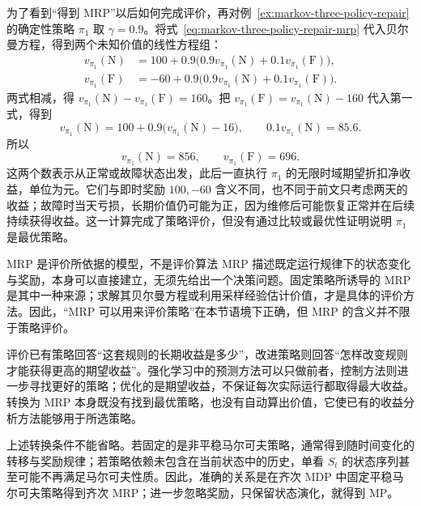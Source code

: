 \documentclass[UTF8]{ctexart}
\begin{document}
为了看到“得到 MRP”以后如何完成评价，再对例~\ref{ex:markov-three-policy-repair} 的确定性策略 $\pi_1$ 取 $\gamma=0.9$。将式~\eqref{eq:markov-three-policy-repair-mrp} 代入贝尔曼方程，得到两个未知价值的线性方程组：
\begin{equation}
  \begin{aligned}
    v_{\pi_1}(\mathrm N)&=100+0.9\bigl(0.9v_{\pi_1}(\mathrm N)+0.1v_{\pi_1}(\mathrm F)\bigr),\\
    v_{\pi_1}(\mathrm F)&=-60+0.9\bigl(0.9v_{\pi_1}(\mathrm N)+0.1v_{\pi_1}(\mathrm F)\bigr).
  \end{aligned}
  \label{eq:markov-three-repair-bellman}
\end{equation}
两式相减，得 $v_{\pi_1}(\mathrm N)-v_{\pi_1}(\mathrm F)=160$。把 $v_{\pi_1}(\mathrm F)=v_{\pi_1}(\mathrm N)-160$ 代入第一式，得到
\[
  v_{\pi_1}(\mathrm N)=100+0.9\bigl(v_{\pi_1}(\mathrm N)-16\bigr),
  \qquad
  0.1v_{\pi_1}(\mathrm N)=85.6.
\]
所以
\begin{equation}
  v_{\pi_1}(\mathrm N)=856,\qquad v_{\pi_1}(\mathrm F)=696.
  \label{eq:markov-three-repair-values}
\end{equation}
这两个数表示从正常或故障状态出发，此后一直执行 $\pi_1$ 的无限时域期望折扣净收益，单位为元。它们与即时奖励 $100,-60$ 含义不同，也不同于前文只考虑两天的收益；故障时当天亏损，长期价值仍可能为正，因为维修后可能恢复正常并在后续持续获得收益。这一计算完成了策略评价，但没有通过比较或最优性证明说明 $\pi_1$ 是最优策略。

\begin{remarkbox}[label={rem:markov-three-mrp-evaluation}]{MRP 是评价所依据的模型，不是评价算法}
MRP 描述既定运行规律下的状态变化与奖励，本身可以直接建立，无须先给出一个决策问题。固定策略所诱导的 MRP 是其中一种来源；求解其贝尔曼方程或利用采样经验估计价值，才是具体的评价方法。因此，“MRP 可以用来评价策略”在本节语境下正确，但 MRP 的含义并不限于策略评价。

评价已有策略回答“这套规则的长期收益是多少”，改进策略则回答“怎样改变规则才能获得更高的期望收益”。强化学习中的预测方法可以只做前者，控制方法则进一步寻找更好的策略；优化的是期望收益，不保证每次实际运行都取得最大收益。转换为 MRP 本身既没有找到最优策略，也没有自动算出价值，它使已有的收益分析方法能够用于所选策略。
\end{remarkbox}

上述转换条件不能省略。若固定的是非平稳马尔可夫策略，通常得到随时间变化的转移与奖励规律；若策略依赖未包含在当前状态中的历史，单看 $S_t$ 的状态序列甚至可能不再满足马尔可夫性质。因此，准确的关系是在齐次 MDP 中固定平稳马尔可夫策略得到齐次 MRP；进一步忽略奖励，只保留状态演化，就得到 MP。
\end{document}

